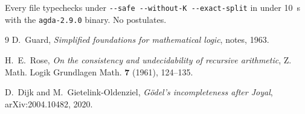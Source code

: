\documentclass[11pt]{article}
\begin{document}
Every file typechecks under \verb|--safe --without-K --exact-split|
in under 10~s with the \verb|agda-2.9.0| binary.  No postulates.

\begin{thebibliography}{9}
D.~Guard, \emph{Simplified foundations for mathematical logic},
notes, 1963.

H.~E.~Rose, \emph{On the consistency and undecidability of recursive
arithmetic}, Z. Math. Logik Grundlagen Math. \textbf{7} (1961),
124--135.

D.~Dijk and M.~Gietelink-Oldenziel,
\emph{G\"odel's incompleteness after Joyal},
arXiv:2004.10482, 2020.

\end{thebibliography}
\end{document}
